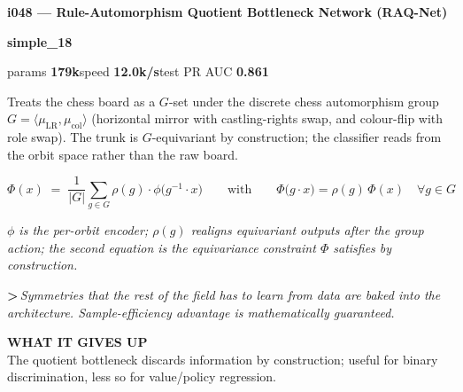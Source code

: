\documentclass[10pt,a4paper]{article}
\newcommand{\pillsi}[0]{\colorbox{s18redbg}{\strut\textcolor{s18red}{\scriptsize\bfseries\sffamily simple\_18}}}
\begin{document}
\begin{tcolorbox}
\begin{tcolorbox}[archhead, boxsep=0pt, top=4pt, bottom=4pt]
\textcolor{deepforest}{\sffamily\bfseries\large i048 --- Rule-Automorphism Quotient Bottleneck Network (RAQ-Net)}\\[2pt]
\textcolor{muted}{\sffamily\scriptsize \pillsi{}\quad params \textbf{179k}\quad speed \textbf{12.0k/s}\quad test PR AUC \textbf{0.861}}
\end{tcolorbox}
\smallskip
Treats the chess board as a $G$-set under the discrete chess automorphism group $G = \langle \mu_{\mathrm{LR}}, \mu_{\mathrm{col}} \rangle$ (horizontal mirror with castling-rights swap, and colour-flip with role swap). The trunk is $G$-equivariant by construction; the classifier reads from the orbit space rather than the raw board.
\par\smallskip
\begin{equation*}
\Phi(x) \;=\; \frac{1}{|G|} \sum_{g \in G} \rho(g) \cdot \phi\!\bigl(g^{-1}\cdot x\bigr)\qquad \text{with} \qquad \Phi\!\bigl(g\cdot x\bigr) = \rho(g)\,\Phi(x)\quad \forall g \in G
\end{equation*}
\par\vspace{-4pt}\begin{center}\textit{\textcolor{muted}{\small $\phi$ is the per-orbit encoder; $\rho(g)$ realigns equivariant outputs after the group action; the second equation is the equivariance constraint $\Phi$ satisfies by construction.}}\end{center}
\par\smallskip
{\color{forest}\sffamily\bfseries\textgreater\,}\textit{Symmetries that the rest of the field has to learn from data are baked into the architecture. Sample-efficiency advantage is mathematically guaranteed.}
\par\smallskip\textbf{\sffamily\footnotesize\color{muted}WHAT IT GIVES UP}\\
The quotient bottleneck discards information by construction; useful for binary discrimination, less so for value/policy regression.
\end{tcolorbox}
\end{document}

